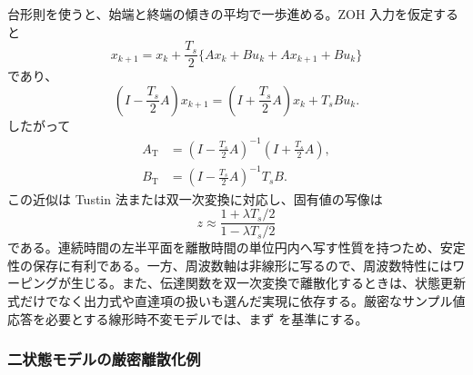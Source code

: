 台形則を使うと、始端と終端の傾きの平均で一歩進める。ZOH 入力を仮定すると
\begin{equation}
  x_{k+1}=x_k+\frac{T_s}{2}\{Ax_k+Bu_k+Ax_{k+1}+Bu_k\}
\end{equation}
であり、
\begin{equation}
  (I-\frac{T_s}{2}A)x_{k+1}
  =(I+\frac{T_s}{2}A)x_k+T_sB u_k.
\end{equation}
したがって
\begin{align}
  A_{\mathrm{T}}&=\left(I-\frac{T_s}{2}A\right)^{-1}
                 \left(I+\frac{T_s}{2}A\right),\\
  B_{\mathrm{T}}&=\left(I-\frac{T_s}{2}A\right)^{-1}T_sB.
  \label{eq:tustin-discretization}
\end{align}
この近似は Tustin 法または双一次変換に対応し、固有値の写像は
\begin{equation}
  z\approx\frac{1+\lambda T_s/2}{1-\lambda T_s/2}
\end{equation}
である。連続時間の左半平面を離散時間の単位円内へ写す性質を持つため、安定性の保存に有利である。一方、周波数軸は非線形に写るので、周波数特性にはワーピングが生じる。また、伝達関数を双一次変換で離散化するときは、状態更新式だけでなく出力式や直達項の扱いも選んだ実現に依存する。厳密なサンプル値応答を必要とする線形時不変モデルでは、まず  を基準にする。

\subsubsection{二状態モデルの厳密離散化例}

